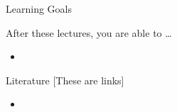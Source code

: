 \begin{frame}[c]{Learning Goals}

After these lectures, you are able to \ldots

\begin{itemize}
	\item 
\end{itemize}

\end{frame}

\begin{frame}[c]{Literature [These are links]}

\begin{itemize}
	\item {}	
	
\end{itemize}

\end{frame}


